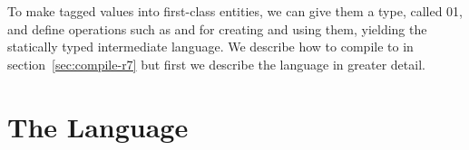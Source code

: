 \documentclass[7x10]{TimesAPriori_MIT}%
\def\racketEd{0}
\def\pythonEd{1}
\def\edition{0}
\newcommand{\racket}[1]{{\if\edition\racketEd{#1}\fi}}
\newcommand{\python}[1]{{\if\edition\pythonEd #1\fi}}
\numberwithin{theorem}{chapter}
\numberwithin{definition}{chapter}
\numberwithin{equation}{chapter}
\begin{document}
To make tagged values into first-class entities, we can give them a
type, called \racket{}\python{}, and define
operations such as  and  for creating and
using them, yielding the statically typed \LangAny{} intermediate
language. We describe how to compile \LangDyn{} to \LangAny{} in
section~\ref{sec:compile-r7} but first we describe the \LangAny{}
language in greater detail.

\section{The \LangAny{} Language}
\label{sec:Rany-lang}

\newcommand{\LanyASTRacket}{
\begin{array}{lcl}
\Type &::= & \ANYTY \\
\FType &::=& \key{Integer} \MID \key{Boolean} \MID \key{Void} 
      \MID \LP\key{Vector}\; \ANYTY\ldots\RP 
      \MID \LP\ANYTY\ldots \; \key{->}\; \ANYTY\RP\\
\itm{op} &::= & \code{any-vector-length}
     \MID \code{any-vector-ref} \MID \code{any-vector-set!}\\
    &\MID& \code{boolean?} \MID \code{integer?} \MID \code{vector?}
     \MID \code{procedure?} \MID \code{void?} \\
  \Exp &::=& \INJECT{\Exp}{\FType} \MID \PROJECT{\Exp}{\FType} 
\end{array}
}

\newcommand{\LanyASTPython}{
\begin{array}{lcl}
\Type &::= & \key{AnyType()} \\
\FType &::=& \key{IntType()} \MID \key{BoolType()} \MID \key{VoidType()}
  \MID \key{TupleType}\LS\key{AnyType()}^+\RS \\
  &\MID& \key{FunctionType}\LP \key{AnyType()}^{*}\key{, }\key{AnyType()}\RP \\
\Exp & ::= & \INJECT{\Exp}{\FType} \MID \PROJECT{\Exp}{\FType} \\
     &\MID& \CALL{\VAR{\key{'any\_tuple\_load'}}}{\LS\Exp\key{, }\Exp\RS}\\
     &\MID& \CALL{\VAR{\key{'any\_len'}}}{\LS\Exp\RS} \\
     &\MID& \CALL{\VAR{\key{'arity'}}}{\LS\Exp\RS}  \\
     &\MID& \CALL{\VAR{\key{'make\_any'}}}{\LS\Exp\key{, }\INT{\Int}\RS} 
\end{array}
}
\end{document}
